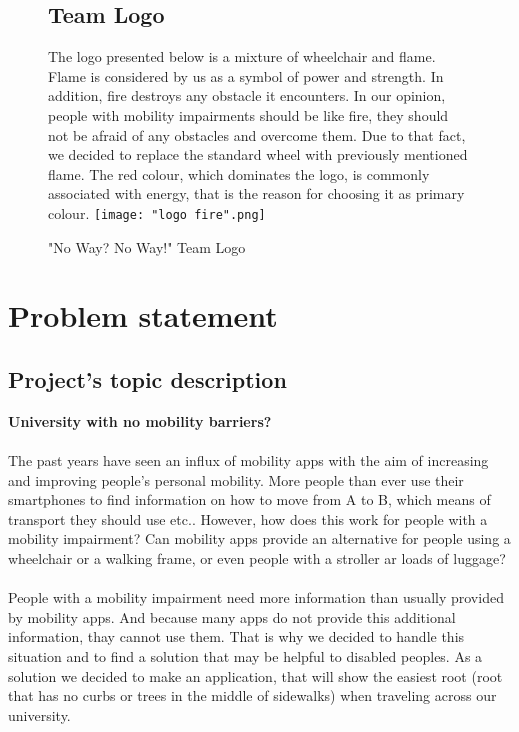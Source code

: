 \documentclass[12pt]{article}
\begin{document}
\begin{figure}[H]
\subsection{Team Logo}
The logo presented below is a mixture of wheelchair and flame. Flame is considered by us as a symbol of power and strength. In addition, fire destroys any obstacle it encounters. In our opinion, people with mobility impairments should be like fire, they should not be afraid of any obstacles and overcome them. Due to that fact, we decided to replace the standard wheel with previously mentioned flame. The red colour, which dominates the logo, is commonly associated with energy, that is the reason for choosing it as primary colour.
\texttt{[image: "logo fire".png]}
\caption{"No Way? No Way!" Team Logo}
\label{fig:logo}
\end{figure}


\section{Problem statement}
\subsection{Project's topic description}
\textbf{University with no mobility barriers?} \\\\
The past years have seen an influx of mobility apps with the aim of increasing and improving people's personal mobility. More people than ever use their smartphones to find information on how to move from A to B, which means of transport they should use etc.. However, how does this work for people with a mobility impairment? Can mobility apps provide an alternative for people using a wheelchair or a walking frame, or even people with a stroller ar loads of luggage?\\\\
People with a mobility impairment need more information than usually provided by mobility apps. And because many apps do not provide this additional information, thay cannot use them. That is why we decided to handle this situation and to find a solution that may be helpful to disabled peoples.
As a solution we decided to make an application, that will show the easiest root (root that has no curbs or trees in the middle of sidewalks) when traveling across our university. 
\end{document}
